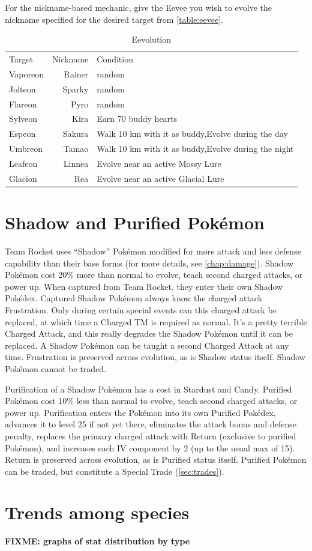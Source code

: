 For the nickname-based mechanic, give the Eevee you wish to evolve the nickname
  specified for the desired target from \autoref{table:eevee}.
\begin{table}
  \begin{center}
    \begin{tabular}{lrp{}}
      Target & Nickname & Condition\\
      \Midrule
      Vaporeon & Rainer & random\\
      Jolteon & Sparky & random\\
      Flareon & Pyro & random\\
      Sylveon & Kira & Earn 70 buddy hearts \\
      Espeon & Sakura & Walk 10 km with it as buddy,\newline Evolve during the day\\
      Umbreon & Tamao & Walk 10 km with it as buddy,\newline Evolve during the night\\
      Leafeon & Linnea & Evolve near an active Mossy Lure\\
      Glacion & Rea & Evolve near an active Glacial Lure\\
    \end{tabular}
  \end{center}
  \caption{Eevolution}
  \label{table:eevee}
\end{table}

\section{Shadow and Purified Pokémon}
Team Rocket uses ``Shadow'' Pokémon modified for more attack
 and less defense capability than their base forms (for more details,
 see \autoref{chap:damage}).
Shadow Pokémon cost 20\% more than normal to evolve, teach second charged attacks, or power up.
When captured from Team Rocket, they enter their own Shadow Pokédex.
Captured Shadow Pokémon always know the charged attack Frustration.
Only during certain special events can this charged attack be replaced,
 at which time a Charged TM is required as normal.
It's a pretty terrible Charged Attack, and this really degrades the
 Shadow Pokémon until it can be replaced.
A Shadow Pokémon can be taught a second Charged Attack at any time.
Frustration is preserved across evolution, as is Shadow status itself.
Shadow Pokémon cannot be traded.

Purification of a Shadow Pokémon has a cost in Stardust and Candy.
Purified Pokémon cost 10\% less than normal to evolve, teach second charged attacks, or power up.
Purification enters the Pokémon into its own Purified Pokédex,
 advances it to level 25 if not yet there,
 eliminates the attack bonus and defense penalty,
 replaces the primary charged attack with Return (exclusive to purified Pokémon),
 and increases each IV component by 2  (up to the usual max of 15).
Return is preserved across evolution, as is Purified status itself.
Purified Pokémon can be traded, but constitute a Special Trade (\autoref{sec:trades}).

\section{Trends among species}
\textbf{FIXME: graphs of stat distribution by type}

